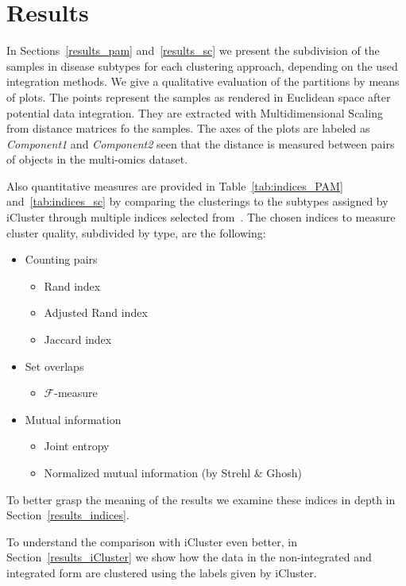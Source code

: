 \chapter{Results}

In Sections~\ref{results_pam} and~\ref{results_sc} we present the subdivision of the samples in disease subtypes for each clustering approach, depending on the used integration methods. We give a qualitative evaluation of the partitions by means of plots. The points represent the samples as rendered in Euclidean space after potential data integration. They are extracted with Multidimensional Scaling from distance matrices fo the samples. The axes of the plots are labeled as \textit{Component1} and \textit{Component2} seen that the distance is measured between pairs of objects in the multi-omics dataset.

Also quantitative measures are provided in Table~\ref{tab:indices_PAM} and~\ref{tab:indices_sc} by comparing the clusterings to the subtypes assigned by iCluster through multiple indices selected from~\cite{wagner2007comparing}. The chosen indices to measure cluster quality, subdivided by type, are the following:
\begin{itemize}
    \item Counting pairs
    \begin{itemize}             
        \item Rand index
        \item Adjusted Rand index
        \item Jaccard index
    \end{itemize}
    \item Set overlaps
    \begin{itemize}
        \item $\mathcal{F}$-measure
    \end{itemize}
    \item Mutual information
    \begin{itemize}
        \item Joint entropy
        \item Normalized mutual information (by Strehl \& Ghosh)
    \end{itemize}
\end{itemize}
To better grasp the meaning of the results we examine these indices in depth in Section~\ref{results_indices}.

To understand the comparison with iCluster even better, in Section~\ref{results_iCluster} we show how the data in the non-integrated and integrated form are clustered using the labels given by iCluster.

